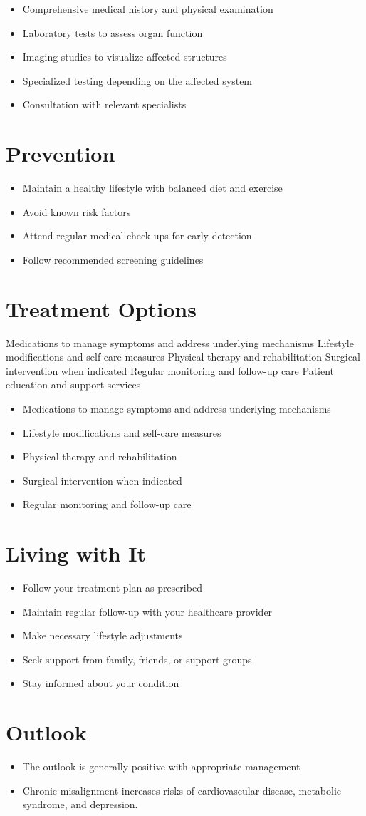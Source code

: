 \begin{itemize}[noitemsep]
  \item Comprehensive medical history and physical examination
  \item Laboratory tests to assess organ function
  \item Imaging studies to visualize affected structures
  \item Specialized testing depending on the affected system
  \item Consultation with relevant specialists
\end{itemize}
\section{Prevention}
\begin{itemize}[noitemsep]
  \item Maintain a healthy lifestyle with balanced diet and exercise
  \item Avoid known risk factors
  \item Attend regular medical check-ups for early detection
  \item Follow recommended screening guidelines
\end{itemize}
\section{Treatment Options}
Medications to manage symptoms and address underlying mechanisms Lifestyle modifications and self-care measures Physical therapy and rehabilitation Surgical intervention when indicated Regular monitoring and follow-up care Patient education and support services

\begin{itemize}[noitemsep]
  \item Medications to manage symptoms and address underlying mechanisms
  \item Lifestyle modifications and self-care measures
  \item Physical therapy and rehabilitation
  \item Surgical intervention when indicated
  \item Regular monitoring and follow-up care
\end{itemize}
\section{Living with It}
\begin{itemize}[noitemsep]
  \item Follow your treatment plan as prescribed
  \item Maintain regular follow-up with your healthcare provider
  \item Make necessary lifestyle adjustments
  \item Seek support from family, friends, or support groups
  \item Stay informed about your condition
\end{itemize}
\section{Outlook}
\begin{itemize}[noitemsep]
  \item The outlook is generally positive with appropriate management
  \item Chronic misalignment increases risks of cardiovascular disease, metabolic syndrome, and depression.
\end{itemize}

